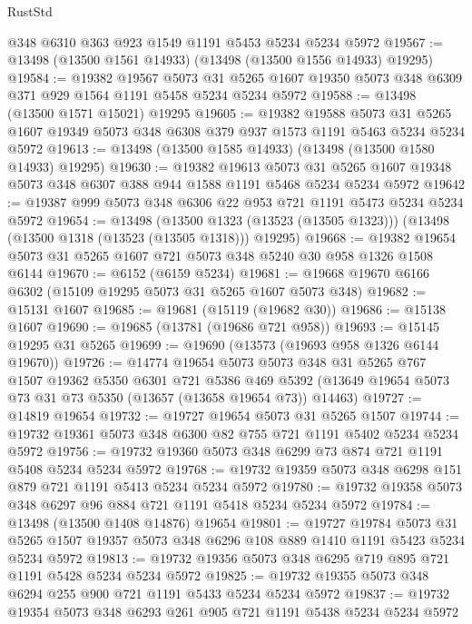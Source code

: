 \begin{lexlean}{RustStd}
\begin{coremodule}
    @348
    @6310
    @363
    @923
    @1549
    @1191
    @5453
    @5234
    @5234
    @5972
@19567 := @13498 (@13500 @1561 @14933) (@13498 (@13500 @1556 @14933) @19295)
@19584 := @19382
    @19567
    @5073
    @31
    @5265
    @1607
    @19350
    @5073
    @348
    @6309
    @371
    @929
    @1564
    @1191
    @5458
    @5234
    @5234
    @5972
@19588 := @13498 (@13500 @1571 @15021) @19295
@19605 := @19382
    @19588
    @5073
    @31
    @5265
    @1607
    @19349
    @5073
    @348
    @6308
    @379
    @937
    @1573
    @1191
    @5463
    @5234
    @5234
    @5972
@19613 := @13498 (@13500 @1585 @14933) (@13498 (@13500 @1580 @14933) @19295)
@19630 := @19382
    @19613
    @5073
    @31
    @5265
    @1607
    @19348
    @5073
    @348
    @6307
    @388
    @944
    @1588
    @1191
    @5468
    @5234
    @5234
    @5972
@19642 := @19387 @999 @5073 @348 @6306 @22 @953 @721 @1191 @5473 @5234 @5234 @5972
@19654 := @13498
    (@13500 @1323 (@13523 (@13505 @1323)))
    (@13498 (@13500 @1318 (@13523 (@13505 @1318))) @19295)
@19668 := @19382 @19654 @5073 @31 @5265 @1607 @721 @5073 @348 @5240 @30 @958 @1326 @1508 @6144
@19670 := @6152 (@6159 @5234)
@19681 := @19668 @19670 @6166 @6302 (@15109 @19295 @5073 @31 @5265 @1607 @5073 @348)
@19682 := @15131 @1607
@19685 := @19681 (@15119 (@19682 @30))
@19686 := @15138 @1607
@19690 := @19685 (@13781 (@19686 @721 @958))
@19693 := @15145 @19295 @31 @5265
@19699 := @19690 (@13573 (@19693 @958 @1326 @6144 @19670))
@19726 := @14774
    @19654
    @5073
    @5073
    @348
    @31
    @5265
    @767
    @1507
    @19362
    @5350
    @6301
    @721
    @5386
    @469
    @5392
    (@13649 @19654 @5073 @73 @31 @73 @5350 (@13657 (@13658 @19654 @73)) @14463)
@19727 := @14819 @19654
@19732 := @19727 @19654 @5073 @31 @5265 @1507
@19744 := @19732 @19361 @5073 @348 @6300 @82 @755 @721 @1191 @5402 @5234 @5234 @5972
@19756 := @19732 @19360 @5073 @348 @6299 @73 @874 @721 @1191 @5408 @5234 @5234 @5972
@19768 := @19732 @19359 @5073 @348 @6298 @151 @879 @721 @1191 @5413 @5234 @5234 @5972
@19780 := @19732 @19358 @5073 @348 @6297 @96 @884 @721 @1191 @5418 @5234 @5234 @5972
@19784 := @13498 (@13500 @1408 @14876) @19654
@19801 := @19727
    @19784
    @5073
    @31
    @5265
    @1507
    @19357
    @5073
    @348
    @6296
    @108
    @889
    @1410
    @1191
    @5423
    @5234
    @5234
    @5972
@19813 := @19732 @19356 @5073 @348 @6295 @719 @895 @721 @1191 @5428 @5234 @5234 @5972
@19825 := @19732 @19355 @5073 @348 @6294 @255 @900 @721 @1191 @5433 @5234 @5234 @5972
@19837 := @19732 @19354 @5073 @348 @6293 @261 @905 @721 @1191 @5438 @5234 @5234 @5972

\end{coremodule}
\end{lexlean}
